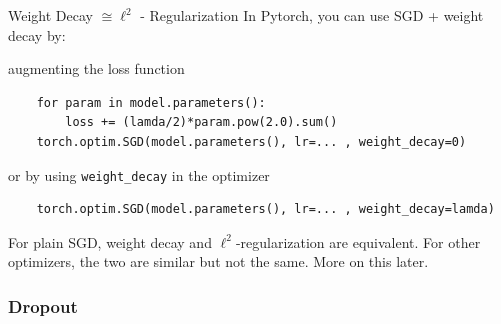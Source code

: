 \begin{frame}[allowframebreaks]

\begin{myconceptblock}{6.10}{Weight Decay $\cong \ell^{2}$ - Regularization}
    In Pytorch, you can use SGD + weight decay by:

    augmenting the loss function

    \begin{verbatim}
    for param in model.parameters():
        loss += (lamda/2)*param.pow(2.0).sum()
    torch.optim.SGD(model.parameters(), lr=... , weight_decay=0)
    \end{verbatim}

    or by using \verb|weight_decay| in the optimizer

    \begin{verbatim}
    torch.optim.SGD(model.parameters(), lr=... , weight_decay=lamda)
    \end{verbatim}

    \par\noindent\textcolor{gray}{\hdashrule{\textwidth}{0.4pt}{1pt 2pt}}

    For plain SGD, weight decay and $\ell^{2}$-regularization are equivalent. For other optimizers, the two are similar but not the same. More on this later.
\end{myconceptblock}

\end{frame}

\subsubsection{Dropout}

